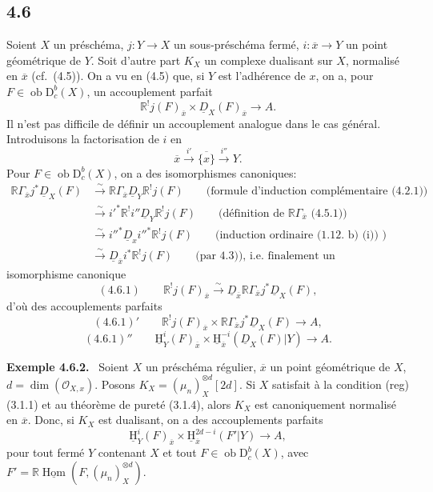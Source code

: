 \documentclass[11pt]{article}
\providecommand{\cO}{\mathcal{O}}
\providecommand{\uH}{\underline{\mathrm H}}
\newenvironment{statement}[1]{\par\medskip\noindent\textbf{#1.}\ }{\par\medskip}
\DeclareMathOperator{\Hom}{Hom}
\newcommand{\R}{\mathbb{R}}\newcommand{\RHomCore}{\mathbb{R}\mathrm{Hom}}
\newcommand{\D}{\mathrm{D}}
\newcommand{\ob}{\operatorname{ob}}
\newcommand{\ol}[1]{\overline{#1}}
\providecommand{\Hom}{\operatorname{Hom}}
\providecommand{\ob}{\operatorname{ob}}
\providecommand{\R}{\mathrm R}
\providecommand{\Hom}{\operatorname{Hom}}
\begin{document}
\subsection*{4.6}
Soient $X$ un préschéma, $j:Y\to X$ un sous-préschéma fermé, $i:\ol{x}\to Y$ un point géométrique de $Y$. Soit d'autre part $K_X$ un complexe dualisant sur $X$, normalisé en $\ol{x}$ (cf.~(4.5)). On a vu en (4.5) que, si $Y$ est l'adhérence de $x$, on a, pour $F\in\ob\D_c^b(X)$, un accouplement parfait
\[
\R^{!}j(F)_{\ol{x}}\times \underline{D}_X(F)_{\ol{x}}\longrightarrow A.
\]
Il n'est pas difficile de définir un accouplement analogue dans le cas général. Introduisons la factorisation de $i$ en
\[
\ol{x}\xrightarrow{i'}\ol{\{x\}}\xrightarrow{i''}Y.
\]
Pour $F\in\ob\D_c^b(X)$, on a des isomorphismes canoniques:
\[
\begin{aligned}
\R\Gamma_{\ol{x}}j^*\underline{D}_X(F)&\xrightarrow{\sim}\R\Gamma_{\ol{x}}\underline{D}_Y\R^{!}j(F)\qquad\text{(formule d'induction complémentaire (4.2.1))}\\
&\xrightarrow{\sim}i'^*\R^{!}i''\underline{D}_Y\R^{!}j(F)\qquad\text{(définition de $\R\Gamma_{\ol{x}}$ (4.5.1))}\\
&\xrightarrow{\sim}i''^*\underline{D}_{x}i''^*\R^{!}j(F)\qquad\text{(induction ordinaire (1.12. b) (i)) )}\\
&\xrightarrow{\sim}\underline{D}_{\ol{x}}i^*\R^{!}j(F)\qquad\text{(par 4.3)), i.e. finalement un}
\end{aligned}
\]
isomorphisme canonique
\[
(4.6.1)\qquad \R^{!}j(F)_{\ol{x}}\xrightarrow{\sim}\underline{D}_{\ol{x}}\R\Gamma_{\ol{x}}j^*\underline{D}_X(F),
\]
d'où des accouplements parfaits
\[
(4.6.1)'\qquad \R^{!}j(F)_{\ol{x}}\times \R\Gamma_{\ol{x}}j^*\underline{D}_X(F)\longrightarrow A,
\]
\[
(4.6.1)''\qquad \uH_Y^i(F)_{\ol{x}}\times \uH_{\ol{x}}^{-i}(\underline{D}_X(F)|Y)\longrightarrow A.
\]

\begin{statement}{Exemple 4.6.2}
Soient $X$ un préschéma régulier, $\ol{x}$ un point géométrique de $X$, $d=\dim(\cO_{X,x})$. Posons $K_X=(\mu_n)_X^{\otimes d}[2d]$. Si $X$ satisfait à la condition (reg) (3.1.1) et au théorème de pureté (3.1.4), alors $K_X$ est canoniquement normalisé en $\ol{x}$. Donc, si $K_X$ est dualisant, on a des accouplements parfaits
\[
\uH_Y^i(F)_{\ol{x}}\times \uH_{\ol{x}}^{2d-i}(F'|Y)\longrightarrow A,
\]
pour tout fermé $Y$ contenant $X$ et tout $F\in\ob\D_c^b(X)$, avec $F'=\R\underline{\Hom}(F,(\mu_n)_X^{\otimes d})$.
\end{statement}
\end{document}
